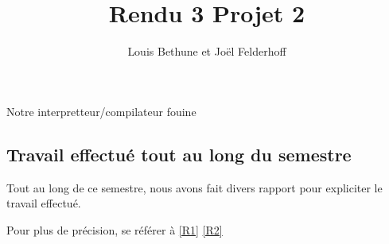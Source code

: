 \documentclass[a4paper,10pt]{report}
\title{Rendu 3 Projet 2}
\author{Louis Bethune et Jo\"el Felderhoff}
\date{}
\begin{document}
\maketitle

\begin{section}{Notre interpretteur/compilateur fouine}

\subsection{Travail effectué tout au long du semestre}
Tout au long de ce semestre, nous avons fait divers rapport pour expliciter le travail effectué.

Pour plus de précision, se référer à \ref{R1} \ref{R2}

\end{section}
\end{document}
